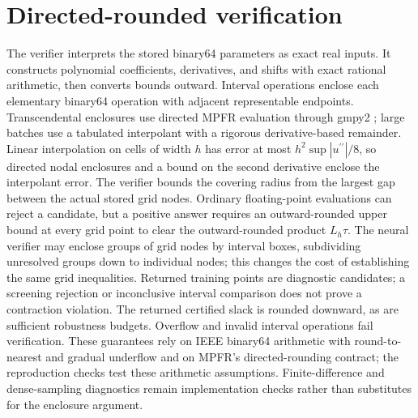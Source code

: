 \documentclass[12pt,onecolumn,journal]{IEEEtran}
\begin{document}
\section{Directed-rounded verification}
\label{app:numerics}
The verifier interprets the stored binary64 parameters as exact real inputs. It constructs polynomial coefficients, derivatives, and shifts with exact rational arithmetic, then converts bounds outward. Interval operations enclose each elementary binary64 operation with adjacent representable endpoints. Transcendental enclosures use directed MPFR evaluation through gmpy2 \cite{fousse2007}; large batches use a tabulated interpolant with a rigorous derivative-based remainder. Linear interpolation on cells of width $h$ has error at most $h^2\sup|u^{\prime\prime}|/8$, so directed nodal enclosures and a bound on the second derivative enclose the interpolant error. The verifier bounds the covering radius from the largest gap between the actual stored grid nodes. Ordinary floating-point evaluations can reject a candidate, but a positive answer requires an outward-rounded upper bound at every grid point to clear the outward-rounded product $L_h\tau$. The neural verifier may enclose groups of grid nodes by interval boxes, subdividing unresolved groups down to individual nodes; this changes the cost of establishing the same grid inequalities. Returned training points are diagnostic candidates; a screening rejection or inconclusive interval comparison does not prove a contraction violation. The returned certified slack is rounded downward, as are sufficient robustness budgets. Overflow and invalid interval operations fail verification. These guarantees rely on IEEE binary64 arithmetic with round-to-nearest and gradual underflow and on MPFR's directed-rounding contract; the reproduction checks test these arithmetic assumptions. Finite-difference and dense-sampling diagnostics remain implementation checks rather than substitutes for the enclosure argument.
\end{document}
